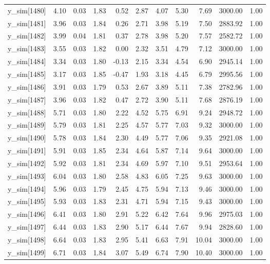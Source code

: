 \begin{table}[ht]
\begin{tabular}{rrrrrrrrrrr}
  y\_sim[1480] & 4.10 & 0.03 & 1.83 & 0.52 & 2.87 & 4.07 & 5.30 & 7.69 & 3000.00 & 1.00 \\ 
  y\_sim[1481] & 3.96 & 0.03 & 1.84 & 0.26 & 2.71 & 3.98 & 5.19 & 7.50 & 2883.92 & 1.00 \\ 
  y\_sim[1482] & 3.99 & 0.04 & 1.81 & 0.37 & 2.78 & 3.98 & 5.20 & 7.57 & 2582.72 & 1.00 \\ 
  y\_sim[1483] & 3.55 & 0.03 & 1.82 & 0.00 & 2.32 & 3.51 & 4.79 & 7.12 & 3000.00 & 1.00 \\ 
  y\_sim[1484] & 3.34 & 0.03 & 1.80 & -0.13 & 2.15 & 3.34 & 4.54 & 6.90 & 2945.14 & 1.00 \\ 
  y\_sim[1485] & 3.17 & 0.03 & 1.85 & -0.47 & 1.93 & 3.18 & 4.45 & 6.79 & 2995.56 & 1.00 \\ 
  y\_sim[1486] & 3.91 & 0.03 & 1.79 & 0.53 & 2.67 & 3.89 & 5.11 & 7.38 & 2782.96 & 1.00 \\ 
  y\_sim[1487] & 3.96 & 0.03 & 1.82 & 0.47 & 2.72 & 3.90 & 5.11 & 7.68 & 2876.19 & 1.00 \\ 
  y\_sim[1488] & 5.71 & 0.03 & 1.80 & 2.22 & 4.52 & 5.75 & 6.91 & 9.24 & 2948.72 & 1.00 \\ 
  y\_sim[1489] & 5.79 & 0.03 & 1.81 & 2.25 & 4.57 & 5.77 & 7.03 & 9.32 & 3000.00 & 1.00 \\ 
  y\_sim[1490] & 5.78 & 0.03 & 1.84 & 2.30 & 4.49 & 5.77 & 7.06 & 9.35 & 2921.08 & 1.00 \\ 
  y\_sim[1491] & 5.91 & 0.03 & 1.85 & 2.34 & 4.64 & 5.87 & 7.14 & 9.64 & 3000.00 & 1.00 \\ 
  y\_sim[1492] & 5.92 & 0.03 & 1.81 & 2.34 & 4.69 & 5.97 & 7.10 & 9.51 & 2953.64 & 1.00 \\ 
  y\_sim[1493] & 6.04 & 0.03 & 1.80 & 2.58 & 4.83 & 6.05 & 7.25 & 9.63 & 3000.00 & 1.00 \\ 
  y\_sim[1494] & 5.96 & 0.03 & 1.79 & 2.45 & 4.75 & 5.94 & 7.13 & 9.46 & 3000.00 & 1.00 \\ 
  y\_sim[1495] & 5.93 & 0.03 & 1.83 & 2.31 & 4.71 & 5.94 & 7.15 & 9.43 & 3000.00 & 1.00 \\ 
  y\_sim[1496] & 6.41 & 0.03 & 1.80 & 2.91 & 5.22 & 6.42 & 7.64 & 9.96 & 2975.03 & 1.00 \\ 
  y\_sim[1497] & 6.44 & 0.03 & 1.83 & 2.90 & 5.17 & 6.44 & 7.67 & 9.94 & 2828.60 & 1.00 \\ 
  y\_sim[1498] & 6.64 & 0.03 & 1.83 & 2.95 & 5.41 & 6.63 & 7.91 & 10.04 & 3000.00 & 1.00 \\ 
  y\_sim[1499] & 6.71 & 0.03 & 1.84 & 3.07 & 5.49 & 6.74 & 7.90 & 10.40 & 3000.00 & 1.00 \\ 

\end{tabular}
\end{table}
